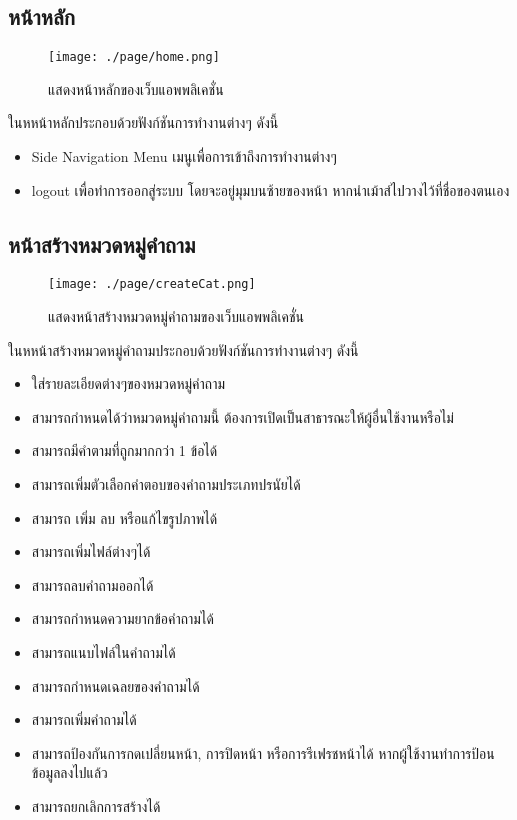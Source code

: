 \subsection{หน้าหลัก}
\begin{figure}[H]
  \centering
  \texttt{[image: ./page/home.png]}
  \caption{แสดงหน้าหลักของเว็บแอพพลิเคชั่น}
  \label{Fig:Homepage}
\end{figure}
ในหหน้าหลักประกอบด้วยฟังก์ชันการทำงานต่างๆ ดังนี้
\begin{itemize}
  \item Side Navigation Menu เมนูเพื่อการเข้าถึงการทำงานต่างๆ
  \item logout เพื่อทำการออกสู่ระบบ โดยจะอยู่มุมบนซ้ายของหน้า หากนำเม้าส์ไปวางไว้ที่ชื่อของตนเอง
\end{itemize}

\subsection{หน้าสร้างหมวดหมู่คำถาม}
\begin{figure}[H]
  \centering
  \texttt{[image: ./page/createCat.png]}
  \caption{แสดงหน้าสร้างหมวดหมู่คำถามของเว็บแอพพลิเคชั่น}
  \label{Fig:createCat}
\end{figure}
ในหหน้าสร้างหมวดหมู่คำถามประกอบด้วยฟังก์ชันการทำงานต่างๆ ดังนี้
\begin{itemize}
  \item ใส่รายละเอียดต่างๆของหมวดหมู่คำถาม
  \item สามารถกำหนดได้ว่าหมวดหมู่คำถามนี้ ต้องการเปิดเป็นสาธารณะให้ผู้อื่นใช้งานหรือไม่
  \item สามารถมีคำตามที่ถูกมากกว่า 1 ข้อได้
  \item สามารถเพิ่มตัวเลือกคำตอบของคำถามประเภทปรนัยได้
  \item สามารถ เพิ่ม ลบ หรือแก้ไขรูปภาพได้
  \item สามารถเพิ่มไฟล์ต่างๆได้
  \item สามารถลบคำถามออกได้
  \item สามารถกำหนดความยากข้อคำถามได้
  \item สามารถแนบไฟล์ในคำถามได้
  \item สามารถกำหนดเฉลยของคำถามได้
  \item สามารถเพิ่มคำถามได้
  \item สามารถป้องกันการกดเปลี่ยนหน้า, การปิดหน้า หรือการรีเฟรชหน้าได้ หากผู้ใช้งานทำการป้อนข้อมูลลงไปแล้ว
  \item สามารถยกเลิกการสร้างได้
\end{itemize}

